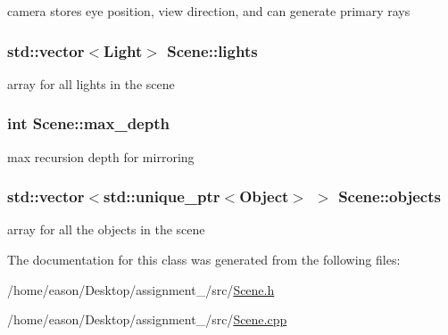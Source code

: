 camera stores eye position, view direction, and can generate primary rays 

\subsubsection[{\texorpdfstring{lights}{lights}}]{\setlength{\rightskip}{0pt plus 5cm}std\+::vector$<${\bf Light}$>$ Scene\+::lights\hspace{0.3cm}{\ttfamily [private]}}\hypertarget{classScene_ab3625e4ac3c6e47156edd23e2421e828}{}\label{classScene_ab3625e4ac3c6e47156edd23e2421e828}


array for all lights in the scene 

\subsubsection[{\texorpdfstring{max\+\_\+depth}{max_depth}}]{\setlength{\rightskip}{0pt plus 5cm}int Scene\+::max\+\_\+depth\hspace{0.3cm}{\ttfamily [private]}}\hypertarget{classScene_a9150039f4d2c46a617b51c7920142d52}{}\label{classScene_a9150039f4d2c46a617b51c7920142d52}


max recursion depth for mirroring 

\subsubsection[{\texorpdfstring{objects}{objects}}]{\setlength{\rightskip}{0pt plus 5cm}std\+::vector$<$std\+::unique\+\_\+ptr$<${\bf Object}$>$ $>$ Scene\+::objects\hspace{0.3cm}{\ttfamily [private]}}\hypertarget{classScene_abbd6f5b3a4639c3b089037519085bf86}{}\label{classScene_abbd6f5b3a4639c3b089037519085bf86}


array for all the objects in the scene 



The documentation for this class was generated from the following files\+:\begin{DoxyCompactItemize}
\item 
/home/eason/\+Desktop/assignment\+\_/src/\hyperlink{Scene_8h}{Scene.\+h}\item 
/home/eason/\+Desktop/assignment\+\_/src/\hyperlink{Scene_8cpp}{Scene.\+cpp}\end{DoxyCompactItemize}
